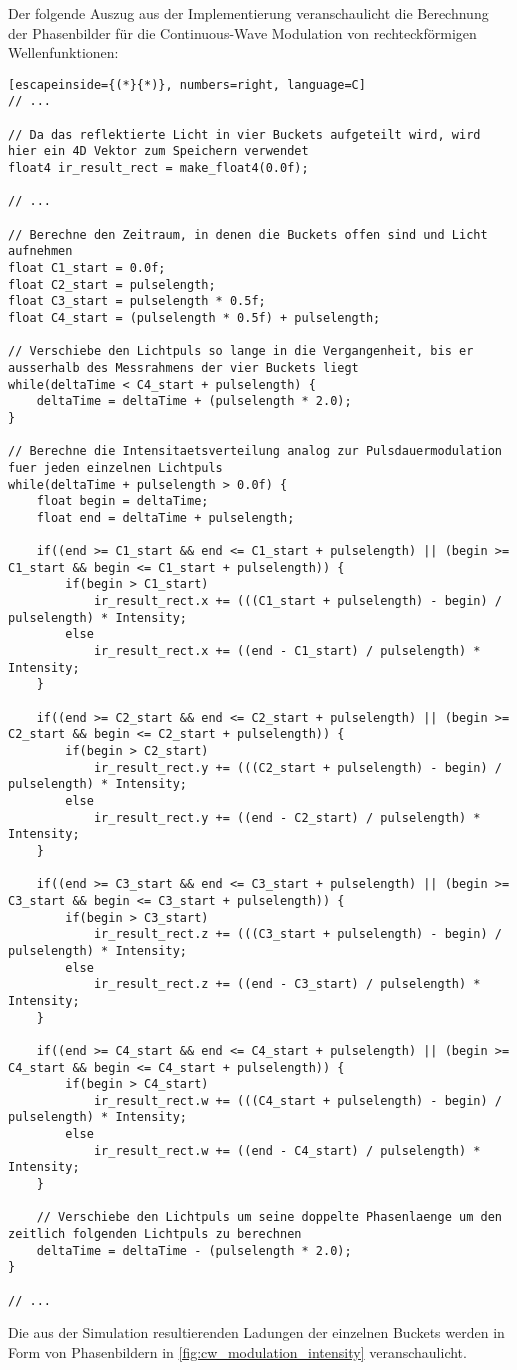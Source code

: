 \documentclass[thesis.tex]{subfiles}
\begin{document}
Der folgende Auszug aus der Implementierung veranschaulicht die Berechnung der Phasenbilder für die Continuous-Wave Modulation von rechteckförmigen Wellenfunktionen:
\begin{lstlisting}[escapeinside={(*}{*)}, numbers=right, language=C]
// ...

// Da das reflektierte Licht in vier Buckets aufgeteilt wird, wird hier ein 4D Vektor zum Speichern verwendet
float4 ir_result_rect = make_float4(0.0f);

// ...

// Berechne den Zeitraum, in denen die Buckets offen sind und Licht aufnehmen
float C1_start = 0.0f;
float C2_start = pulselength;
float C3_start = pulselength * 0.5f;
float C4_start = (pulselength * 0.5f) + pulselength;

// Verschiebe den Lichtpuls so lange in die Vergangenheit, bis er ausserhalb des Messrahmens der vier Buckets liegt
while(deltaTime < C4_start + pulselength) {
    deltaTime = deltaTime + (pulselength * 2.0);
}

// Berechne die Intensitaetsverteilung analog zur Pulsdauermodulation fuer jeden einzelnen Lichtpuls
while(deltaTime + pulselength > 0.0f) {
    float begin = deltaTime;
    float end = deltaTime + pulselength;

    if((end >= C1_start && end <= C1_start + pulselength) || (begin >= C1_start && begin <= C1_start + pulselength)) {
        if(begin > C1_start)
            ir_result_rect.x += (((C1_start + pulselength) - begin) / pulselength) * Intensity;
        else
            ir_result_rect.x += ((end - C1_start) / pulselength) * Intensity;
    }
    
    if((end >= C2_start && end <= C2_start + pulselength) || (begin >= C2_start && begin <= C2_start + pulselength)) {
        if(begin > C2_start)
            ir_result_rect.y += (((C2_start + pulselength) - begin) / pulselength) * Intensity;
        else
            ir_result_rect.y += ((end - C2_start) / pulselength) * Intensity;
    }

    if((end >= C3_start && end <= C3_start + pulselength) || (begin >= C3_start && begin <= C3_start + pulselength)) {
        if(begin > C3_start)
            ir_result_rect.z += (((C3_start + pulselength) - begin) / pulselength) * Intensity;
        else
            ir_result_rect.z += ((end - C3_start) / pulselength) * Intensity;
    }
    
    if((end >= C4_start && end <= C4_start + pulselength) || (begin >= C4_start && begin <= C4_start + pulselength)) {
        if(begin > C4_start)
            ir_result_rect.w += (((C4_start + pulselength) - begin) / pulselength) * Intensity;
        else
            ir_result_rect.w += ((end - C4_start) / pulselength) * Intensity;
    }

    // Verschiebe den Lichtpuls um seine doppelte Phasenlaenge um den zeitlich folgenden Lichtpuls zu berechnen
    deltaTime = deltaTime - (pulselength * 2.0);
}

// ...
\end{lstlisting}
%
Die aus der Simulation resultierenden Ladungen der einzelnen Buckets werden in Form von Phasenbildern in \autoref{fig:cw_modulation_intensity} veranschaulicht.
%
\end{document}
